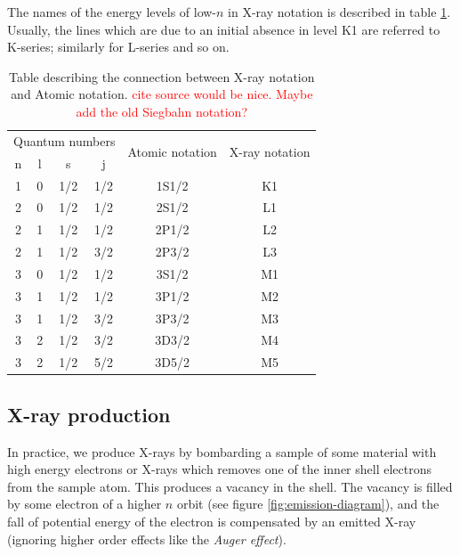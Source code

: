 \documentclass[11pt,a4paper,twoside,onecolumn]{article}
\newcommand{\reminder}[1]{\textcolor{red}{#1}}
\begin{document}
The names of the energy levels of low-$n$ in X-ray notation is described in table \ref{tab:x-ray-notation}. Usually, the lines which are due to an initial absence in level K1 are referred to K-series; similarly for L-series and so on.
\begin{table}[!htb]
    \centering
    \begin{tabular}{@{}cccccc@{}}
    \toprule
    \multicolumn{4}{l}{Quantum numbers} & \multirow{2}{*}{Atomic notation} & \multirow{2}{*}{X-ray notation} \\ \cmidrule(r){1-4}
    n      & l      & s       & j       &                                  &                                 \\ \midrule
    1      & 0      & 1/2     & 1/2     & 1S1/2                            & K1                              \\
    2      & 0      & 1/2     & 1/2     & 2S1/2                            & L1                              \\
    2      & 1      & 1/2     & 1/2     & 2P1/2                            & L2                              \\
    2      & 1      & 1/2     & 3/2     & 2P3/2                            & L3                              \\
    3      & 0      & 1/2     & 1/2     & 3S1/2                            & M1                              \\
    3      & 1      & 1/2     & 1/2     & 3P1/2                            & M2                              \\
    3      & 1      & 1/2     & 3/2     & 3P3/2                            & M3                              \\
    3      & 2      & 1/2     & 3/2     & 3D3/2                            & M4                              \\
    3      & 2      & 1/2     & 5/2     & 3D5/2                            & M5                              \\ \bottomrule
    \end{tabular}
    \caption{Table describing the connection between X-ray notation and Atomic notation. \reminder{cite source would be nice. Maybe add the old Siegbahn notation?}}
    \label{tab:x-ray-notation}
\end{table}

\subsection{X-ray production}\label{subsec:x-ray-production}
In practice, we produce X-rays by bombarding a sample of some material with high energy electrons or X-rays which removes one of the inner shell electrons from the sample atom. This produces a vacancy in the shell. The vacancy is filled by some electron of a higher $n$ orbit (see figure \ref{fig:emission-diagram}), and the fall of potential energy of the electron is compensated by an emitted X-ray (ignoring higher order effects like the \emph{Auger effect}).
\end{document}
